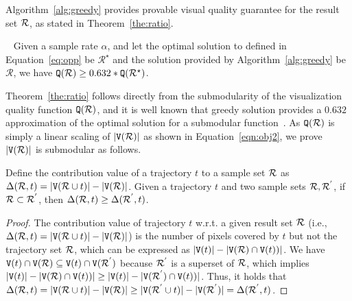 Algorithm~\ref{alg:greedy} provides provable visual quality guarantee for the result set $\mathcal{R}$, as stated in Theorem~\ref{the:ratio}.

\begin{theorem}~\label{the:ratio} Given a sample rate $\alpha$, and let the optimal solution to \prob{} defined in Equation~\eqref{eq:opp} be $\mathcal{R}^{\star}$ and the solution provided by Algorithm~\ref{alg:greedy} be $\mathcal{R}$, we have $\mathtt{Q}(\mathcal{R})\ge 0.632*\mathtt{Q}(\mathcal{R}^{\star})$.
\end{theorem}

Theorem~\ref{the:ratio} follows directly from the submodularity of the visualization quality function $\mathtt{Q}(\mathcal{R})$,
and it is well known that greedy solution provides a $0.632$ approximation of the optimal solution for a submodular function~\cite{fujishige2005submodular}.
As $\mathtt{Q}(\mathcal{R})$ is simply a linear scaling of $|\mathtt{V}(\mathcal{R})|$ as shown in Equation~\eqref{eqn:obj2}, we prove  $|\mathtt{V}(\mathcal{R})|$ is submodular as follows.

\begin{lemma}[Submodularity]\label{lem:submodular}
Define the contribution value of a trajectory $t$ to a sample set $\mathcal{R}$ as $\Delta(\mathcal{R}, t) = |\mathtt{V}(\mathcal{R} \cup t)| - |\mathtt{V}(\mathcal{R})|$.
Given a trajectory $t$ and two sample sets $\mathcal{R},\mathcal{R}^{'}$, if $\mathcal{R} \subset \mathcal{R}^{'}$, then $ \Delta(\mathcal{R}, t) \geq \Delta(\mathcal{R}^{'}, t)$.
\end{lemma}

\begin{proof}
The contribution value of trajectory $t$ w.r.t. a given result set $\mathcal{R}$ (i.e., $\Delta(\mathcal{R}, t) = |\mathtt{V}(\mathcal{R} \cup t)| - |\mathtt{V}(\mathcal{R})|$) is the number of pixels covered by $t$ but not the trajectory set $\mathcal{R}$,
which can be expressed as $|\mathtt{V}(t)| - |\mathtt{V}(\mathcal{R}) \cap \mathtt{V}(t))|$.
We have $\mathtt{V}(t) \cap \mathtt{V}(\mathcal{R}) \subseteq \mathtt{V}(t) \cap \mathtt{V}(\mathcal{R}^{'}) $ because $\mathcal{R}^{'}$ is a superset of $\mathcal{R}$, which implies $|\mathtt{V}(t)| - |\mathtt{V}(\mathcal{R}) \cap \mathtt{V}(t))| \geq |\mathtt{V}(t)| - |\mathtt{V}(\mathcal{R}^{'})\cap \mathtt{V}(t))|$.
Thus, it holds that $\Delta(\mathcal{R}, t) = |\mathtt{V}(\mathcal{R} \cup t)| - |\mathtt{V}(\mathcal{R})| \geq |\mathtt{V}(\mathcal{R}^{'} \cup t)| - |\mathtt{V}(\mathcal{R}^{'})|= \Delta(\mathcal{R}^{'}, t)$.
\end{proof}


